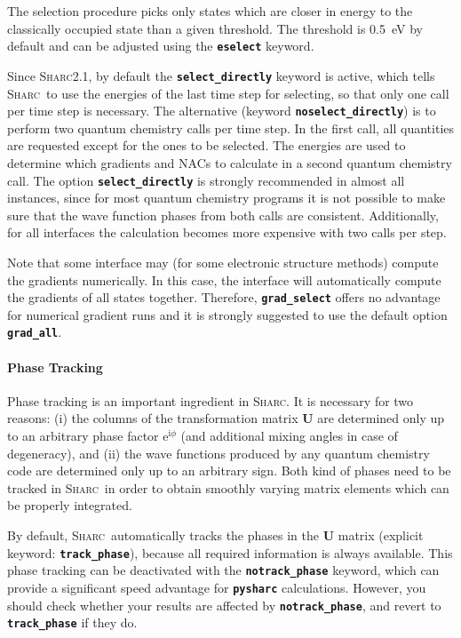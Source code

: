 \documentclass[a4paper,10pt,DIV=15,openany]{scrbook}
\newcommand{\sharc}{\textsc{Sharc}}
\newcommand{\ttt}[1]{\textbf{\texttt{#1}}}
\newcommand{\VEC}[1]{\ensuremath{\mathbf{#1}}}
\begin{document}
The selection procedure picks only states which are closer in energy to the classically occupied state than a given threshold. The threshold is 0.5~eV by default and can be adjusted using the \ttt{eselect} keyword.

Since \sharc2.1, by default the \ttt{select\_directly} keyword is active, which tells \sharc\ to use the energies of the last time step for selecting, so that only one call per time step is necessary.
The alternative (keyword \ttt{noselect\_directly}) is to perform two quantum chemistry calls per time step. In the first call, all quantities are requested except for the ones to be selected. The energies are used to determine which gradients and NACs to calculate in a second quantum chemistry call.
The option \ttt{select\_directly} is strongly recommended in almost all instances, since for most quantum chemistry programs it is not possible to make sure that the wave function phases from both calls are consistent.
Additionally, for all interfaces the calculation becomes more expensive with two calls per step.

Note that some interface may (for some electronic structure methods) compute the gradients numerically.
In this case, the interface will automatically compute the gradients of all states together.
Therefore, \ttt{grad\_select} offers no advantage for numerical gradient runs and it is strongly suggested to use the default option \ttt{grad\_all}.

\paragraph{Phase Tracking}

Phase tracking is an important ingredient in \sharc. It is necessary for two reasons: (i) the columns of the transformation matrix $\VEC{U}$ are determined only up to an arbitrary phase factor $\mathrm{e}^{\mathrm{i}\phi}$ (and additional mixing angles in case of degeneracy), and (ii) the wave functions produced by any quantum chemistry code are determined only up to an arbitrary sign.
Both kind of phases need to be tracked in \sharc\ in order to obtain smoothly varying matrix elements which can be properly integrated.

By default, \sharc\ automatically tracks the phases in the $\VEC{U}$ matrix (explicit keyword: \ttt{track\_phase}), because all required information is always available. This phase tracking can be deactivated with the \ttt{notrack\_phase} keyword, which can provide a significant speed advantage for \ttt{pysharc} calculations. However, you should check whether your results are affected by \ttt{notrack\_phase}, and revert to \ttt{track\_phase} if they do.
\end{document}

